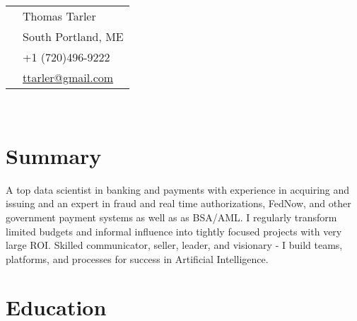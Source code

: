 \documentclass[10pt]{article} %
\begin{document}
\begin{minipage}[t]{0.44\textwidth} %
\vspace{0pt} %


\colorbox{shade}{\textcolor{text}{
\begin{tabular}{c|p{7cm}}
\raisebox{-4pt}{} & Thomas Tarler \\ %
\raisebox{-4pt}{} & South Portland, ME\\ %
\raisebox{-3pt}{} & +1 (720)496-9222 \\ %
\raisebox{-1pt}{} & \href{mailto:ttarler@gmail.com}{ttarler@gmail.com} \\ %
\end{tabular}
}
}\\[10pt]


\section{Summary} 

A top data scientist in banking and payments with experience in acquiring and issuing and an expert in fraud and real time authorizations,  FedNow, and other government payment systems as well as as BSA/AML. I regularly transform limited budgets and informal influence into tightly focused projects with very large ROI. Skilled communicator, seller,  leader, and visionary - I build teams, platforms, and processes for success in Artificial Intelligence. 

	

\section{Education} 

\begin{tabular}{rl} %


\end{tabular}
\end{minipage}
\end{document}
